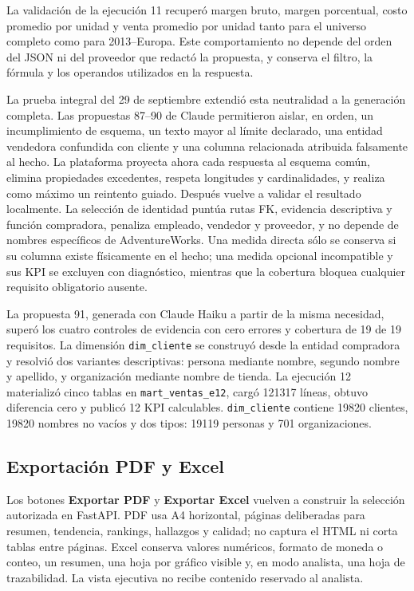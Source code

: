 \documentclass[11pt,letterpaper]{article}
\newcommand{\file}[1]{\texttt{#1}}
\begin{document}
La validación de la ejecución 11 recuperó margen bruto, margen porcentual, costo promedio por unidad y venta promedio por unidad tanto para el universo completo como para 2013--Europa. Este comportamiento no depende del orden del JSON ni del proveedor que redactó la propuesta, y conserva el filtro, la fórmula y los operandos utilizados en la respuesta.

La prueba integral del 29 de septiembre extendió esta neutralidad a la generación completa. Las propuestas 87--90 de Claude permitieron aislar, en orden, un incumplimiento de esquema, un texto mayor al límite declarado, una entidad vendedora confundida con cliente y una columna relacionada atribuida falsamente al hecho. La plataforma proyecta ahora cada respuesta al esquema común, elimina propiedades excedentes, respeta longitudes y cardinalidades, y realiza como máximo un reintento guiado. Después vuelve a validar el resultado localmente. La selección de identidad puntúa rutas FK, evidencia descriptiva y función compradora, penaliza empleado, vendedor y proveedor, y no depende de nombres específicos de AdventureWorks. Una medida directa sólo se conserva si su columna existe físicamente en el hecho; una medida opcional incompatible y sus KPI se excluyen con diagnóstico, mientras que la cobertura bloquea cualquier requisito obligatorio ausente.

La propuesta 91, generada con Claude Haiku a partir de la misma necesidad, superó los cuatro controles de evidencia con cero errores y cobertura de 19 de 19 requisitos. La dimensión \file{dim\_cliente} se construyó desde la entidad compradora y resolvió dos variantes descriptivas: persona mediante nombre, segundo nombre y apellido, y organización mediante nombre de tienda. La ejecución 12 materializó cinco tablas en \file{mart\_ventas\_e12}, cargó 121317 líneas, obtuvo diferencia cero y publicó 12 KPI calculables. \file{dim\_cliente} contiene 19820 clientes, 19820 nombres no vacíos y dos tipos: 19119 personas y 701 organizaciones.

\subsection{Exportación PDF y Excel}

Los botones \textbf{Exportar PDF} y \textbf{Exportar Excel} vuelven a construir la selección autorizada en FastAPI. PDF usa A4 horizontal, páginas deliberadas para resumen, tendencia, rankings, hallazgos y calidad; no captura el HTML ni corta tablas entre páginas. Excel conserva valores numéricos, formato de moneda o conteo, un resumen, una hoja por gráfico visible y, en modo analista, una hoja de trazabilidad. La vista ejecutiva no recibe contenido reservado al analista.
\end{document}
